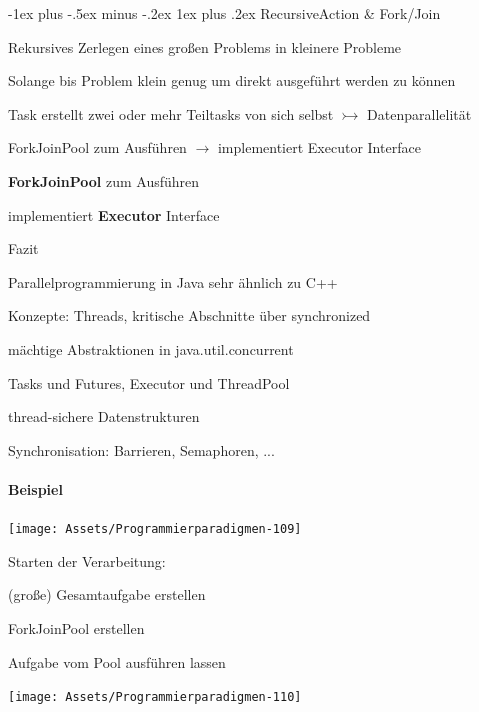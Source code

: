 \documentclass[10pt]{article}
\makeatletter
\renewcommand{\subsubsection}{\@startsection{subsubsection}{3}{0mm}%
                                {-1ex plus -.5ex minus -.2ex}%
                                {1ex plus .2ex}%
                                {\normalfont\small\bfseries}}
\makeatother
\begin{document}
  \subsubsection{RecursiveAction \& Fork/Join}
  \begin{itemize*}
    \item Rekursives Zerlegen eines großen Problems in kleinere Probleme
    \item Solange bis Problem klein genug um direkt ausgeführt werden zu können
    \item Task erstellt zwei oder mehr Teiltasks von sich selbst $\rightarrowtail$ Datenparallelität
    \item ForkJoinPool zum Ausführen $\rightarrow$ implementiert Executor Interface
    \item \textbf{ForkJoinPool} zum Ausführen
    \begin{itemize*}
      \item implementiert \textbf{Executor} Interface
    \end{itemize*}
    \item Fazit
    \begin{itemize*}
      \item Parallelprogrammierung in Java sehr ähnlich zu C++
      \item Konzepte: Threads, kritische Abschnitte über synchronized
      \item mächtige Abstraktionen in java.util.concurrent
      \begin{itemize*}
        \item Tasks und Futures, Executor und ThreadPool
        \item thread-sichere Datenstrukturen
        \item Synchronisation: Barrieren, Semaphoren, ...
      \end{itemize*}
    \end{itemize*}
  \end{itemize*}
  
  \paragraph{Beispiel}
  
  \begin{center}
    \texttt{[image: Assets/Programmierparadigmen-109]}
  \end{center}
  Starten der Verarbeitung: 
  \begin{enumerate*}
    \item (große) Gesamtaufgabe erstellen
    \item ForkJoinPool erstellen
    \item Aufgabe vom Pool ausführen lassen
  \end{enumerate*}
  \begin{center}
    \texttt{[image: Assets/Programmierparadigmen-110]}
  \end{center}
  
\end{document}

